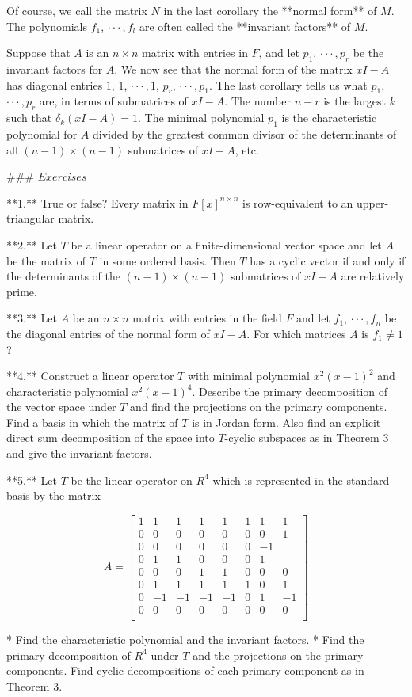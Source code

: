 Of course, we call the matrix \(N\) in the last corollary the **normal form** of \(M\). The polynomials \(f_{1}\), \(\cdot\cdot\cdot\,,f_{l}\) are often called the **invariant factors** of \(M\).

Suppose that \(A\) is an \(n\times n\) matrix with entries in \(F\), and let \(p_{1}\), \(\cdot\cdot\cdot\,,p_{r}\) be the invariant factors for \(A\). We now see that the normal form of the matrix \(xI-A\) has diagonal entries \(1\), \(1\), \(\cdot\cdot\cdot\,,1\), \(p_{r}\), \(\cdot\cdot\cdot\,,p_{1}\). The last corollary tells us what \(p_{1}\), \(\cdot\cdot\cdot\,,p_{r}\) are, in terms of submatrices of \(xI-A\). The number \(n-r\) is the largest \(k\) such that \(\delta_{k}(xI-A)=1\). The minimal polynomial \(p_{1}\) is the characteristic polynomial for \(A\) divided by the greatest common divisor of the determinants of all \((n-1)\times(n-1)\) submatrices of \(xI-A\), etc.

### \(Exercises\)

**1.** True or false? Every matrix in \(F[x]^{n\times n}\) is row-equivalent to an upper-triangular matrix.

**2.** Let \(T\) be a linear operator on a finite-dimensional vector space and let \(A\) be the matrix of \(T\) in some ordered basis. Then \(T\) has a cyclic vector if and only if the determinants of the \((n-1)\times(n-1)\) submatrices of \(xI-A\) are relatively prime.

**3.** Let \(A\) be an \(n\times n\) matrix with entries in the field \(F\) and let \(f_{1}\), \(\cdot\cdot\cdot\,,f_{n}\) be the diagonal entries of the normal form of \(xI-A\). For which matrices \(A\) is \(f_{1}\neq 1\)?

**4.** Construct a linear operator \(T\) with minimal polynomial \(x^{2}(x-1)^{2}\) and characteristic polynomial \(x^{2}(x-1)^{4}\). Describe the primary decomposition of the vector space under \(T\) and find the projections on the primary components. Find a basis in which the matrix of \(T\) is in Jordan form. Also find an explicit direct sum decomposition of the space into \(T\)-cyclic subspaces as in Theorem 3 and give the invariant factors.

**5.** Let \(T\) be the linear operator on \(R^{4}\) which is represented in the standard basis by the matrix

\[A=\begin{bmatrix}1&1&1&1&1&1&1&1\\ 0&0&0&0&0&0&0&1\\ 0&0&0&0&0&0&-1\\ 0&1&1&0&0&0&1\\ 0&0&0&1&1&0&0&0\\ 0&1&1&1&1&1&0&1\\ 0&-1&-1&-1&-1&0&1&-1\\ 0&0&0&0&0&0&0&0\\ \end{bmatrix}\]

* Find the characteristic polynomial and the invariant factors.
* Find the primary decomposition of \(R^{4}\) under \(T\) and the projections on the primary components. Find cyclic decompositions of each primary component as in Theorem 3.

 